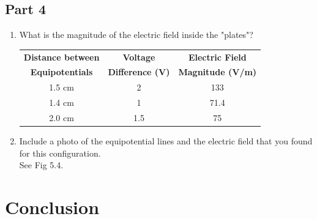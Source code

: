 \documentclass[titlepage]{article}
\begin{document}
		\subsection{Part 4}
		\begin{enumerate}
			\item What is the magnitude of the electric field inside the "plates"?\\
				\FloatBarrier
				\begin{center}
				\begin{table}[hbt!]
			\begin{tabular}{c|c|c}
				\textbf{Distance between} & \textbf{Voltage} & \textbf{Electric Field} \\
				\textbf{Equipotentials} & \textbf{Difference (V)} & \textbf{Magnitude (V/m)}\\
				\hline
				1.5 cm & 2 & 133\\
				1.4 cm & 1 & 71.4    \\
				2.0 cm & 1.5 & 75  \\
			\end{tabular}
			\end{table}
			\end{center}
			\FloatBarrier
			\item Include a photo of the equipotential lines and the electric field that you found for this configuration.\\
			See Fig 5.4.
		\end{enumerate}
	\section{Conclusion}
	
	
\end{document}
